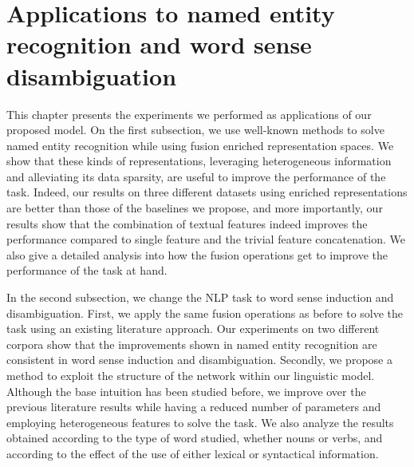 \chapter{Applications to named entity recognition and word sense disambiguation} 
\label{chap:wsd}
\begin{abstractchap}
This chapter presents the experiments we performed as applications of our proposed model. On the first subsection, we use well-known methods to solve named entity recognition while using fusion enriched representation spaces. We show that these kinds of representations, leveraging heterogeneous information and alleviating its data sparsity, are useful to improve the performance of the task. Indeed, our results on three different datasets using enriched representations are better than those of the baselines we propose, and more importantly, our results show that the combination of textual features indeed improves the performance compared to single feature and the trivial feature concatenation. We also give a detailed analysis into how the fusion operations get to improve the performance of the task at hand.

In the second subsection, we change the NLP task to word sense induction and disambiguation. First, we apply the same fusion operations as before to solve the task using an existing literature approach. Our experiments on two different corpora show that the improvements shown in named entity recognition are consistent in word sense induction and disambiguation. Secondly, we propose a method to exploit the structure of the network within our linguistic model. Although the base intuition has been studied before, we improve over the previous  literature results while having a reduced number of parameters and employing heterogeneous features to solve the task. We also analyze the results obtained according to the  type of word studied, whether nouns or verbs, and according to the effect of the use of either lexical or syntactical information.



\end{abstractchap}

